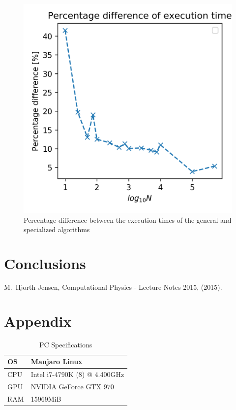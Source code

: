 \documentclass[10pt,showpacs,preprintnumbers,footinbib,amsmath,amssymb,aps,prl,twocolumn,groupedaddress,superscriptaddress,showkeys]{revtex4-1}
\begin{document}
  \begin{figure}[hbtp]
    \center
    \includegraphics[scale=.7]{figs/ex1d_timediff.png}
    \caption{Percentage difference between the execution times of the general and specialized algorithms}
  \end{figure}





\section{Conclusions}

\begin{thebibliography}{99}
 M.~Hjorth-Jensen, Computational Physics - Lecture Notes 2015, (2015).
\end{thebibliography}

\newpage

\appendix
  \section{Appendix}
  \begin{table}[h]
  \caption{PC Specifications}
  \begin{tabular}{|l|l|}
    \hline
    OS & Manjaro Linux \\ \hline
    CPU & Intel i7-4790K (8) @ 4.400GHz \\ \hline
    GPU & NVIDIA GeForce GTX 970  \\ \hline
    RAM & 15969MiB \\ \hline
  \end{tabular}
  \label{tab:specs}
  \end{table}
\end{document}
